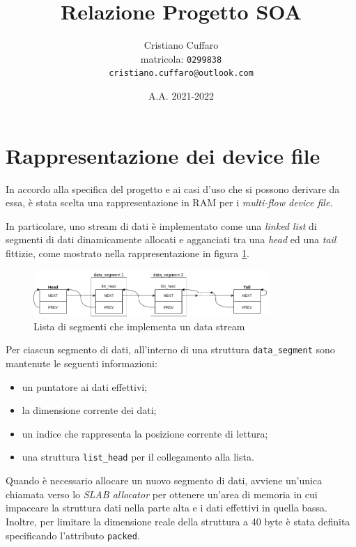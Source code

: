 \documentclass{article}
\begin{document}
\author{%
Cristiano Cuffaro \\
{\small matricola: \texttt{0299838}} \\
{\small \texttt{cristiano.cuffaro@outlook.com}}
}
\title{Relazione Progetto SOA}
\date{A.A. 2021-2022}

\maketitle
\tableofcontents
\newpage

\section{Rappresentazione dei device file}
In accordo alla specifica del progetto e ai casi d'uso che si possono derivare da essa, è stata scelta una rappresentazione in RAM per i \textsl{multi-flow device file}.

In particolare, uno stream di dati è implementato come una \textsl{linked list} di segmenti di dati dinamicamente allocati e agganciati tra una \textsl{head} ed una \textsl{tail} fittizie, come mostrato nella rappresentazione in figura \ref{fig-1}.

\captionsetup[figure]{justification=centering}
\begin{figure}[ht]
\centering
\includegraphics[width=0.8\textwidth]{img/segment-list}
\caption{Lista di segmenti che implementa un data stream}
\label{fig-1}
\end{figure}

Per ciascun segmento di dati, all'interno di una struttura \texttt{data\_segment} sono mantenute le seguenti informazioni:
\begin{itemize}
\item un puntatore ai dati effettivi;
\item la dimensione corrente dei dati;
\item un indice che rappresenta la posizione corrente di lettura;
\item una struttura \texttt{list\_head} per il collegamento alla lista.
\end{itemize}
Quando è necessario allocare un nuovo segmento di dati, avviene un'unica chiamata verso lo \textsl{SLAB allocator} per ottenere un'area di memoria in cui impaccare la struttura dati nella parte alta e i dati effettivi in quella bassa. Inoltre, per limitare la dimensione reale della struttura a 40 byte è stata definita specificando l'attributo \texttt{packed}.
\end{document}
